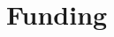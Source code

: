 \documentclass[final, 11pt, nonatbib]{elsarticle}
\theoremstyle{definition}
\theoremstyle{plain}
\numberwithin{equation}{section}
\begin{document}



\section*{Funding}
\end{document}
